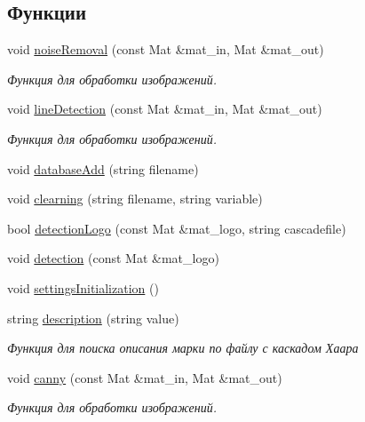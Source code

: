 \subsection*{Функции}
\begin{DoxyCompactItemize}
\item 
void \mbox{\hyperlink{group__corecpp_gab8ed3baad2f1d9b6b82bf74da9dd3d3a}{noise\+Removal}} (const Mat \&mat\+\_\+in, Mat \&mat\+\_\+out)
\begin{DoxyCompactList}\small\item\em Функция для обработки изображений. \end{DoxyCompactList}\item 
void \mbox{\hyperlink{group__corecpp_ga9e277d82296b5ed9eda6266d8dcc24a3}{line\+Detection}} (const Mat \&mat\+\_\+in, Mat \&mat\+\_\+out)
\begin{DoxyCompactList}\small\item\em Функция для обработки изображений. \end{DoxyCompactList}\item 
void \mbox{\hyperlink{group__corecpp_ga10a0271bceabc9c1a0d736ab93113212}{database\+Add}} (string filename)
\item 
void \mbox{\hyperlink{group__corecpp_ga78cdbfbe907847e78cfb387df76d99f9}{clearning}} (string filename, string variable)
\item 
bool \mbox{\hyperlink{group__corecpp_ga76b0b7de3d9fa0de10d66740466ebc14}{detection\+Logo}} (const Mat \&mat\+\_\+logo, string cascadefile)
\item 
void \mbox{\hyperlink{group__corecpp_gae99907f19e7f09055012f68347a57d05}{detection}} (const Mat \&mat\+\_\+logo)
\item 
void \mbox{\hyperlink{group__corecpp_ga242d25c7a9a1b7212bb890023c8131f5}{settings\+Initialization}} ()
\item 
string \mbox{\hyperlink{group__corecpp_gaa85ae460901348b74381239ce0517d5f}{description}} (string value)
\begin{DoxyCompactList}\small\item\em Функция для поиска описания марки по файлу с каскадом Хаара \end{DoxyCompactList}\item 
void \mbox{\hyperlink{group__corecpp_gafe1c5d9570a4ccddf9b5105997e3ddb4}{canny}} (const Mat \&mat\+\_\+in, Mat \&mat\+\_\+out)
\begin{DoxyCompactList}\small\item\em Функция для обработки изображений. \end{DoxyCompactList}\end{DoxyCompactItemize}


